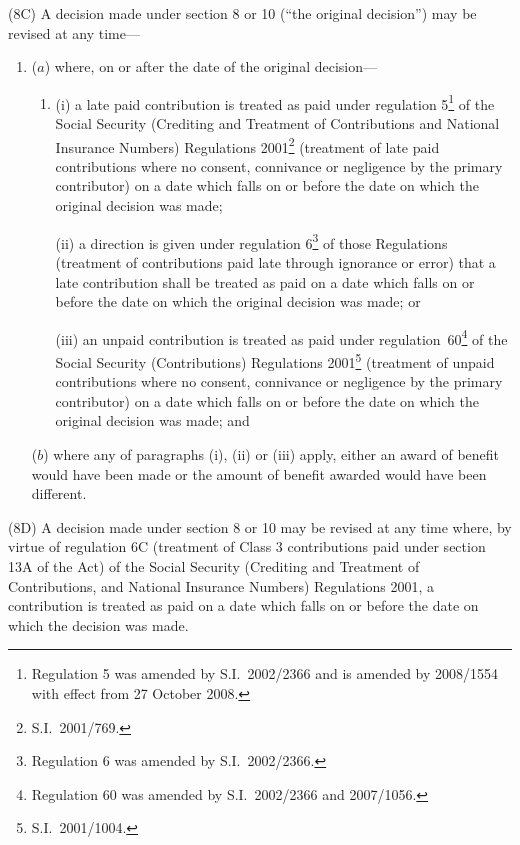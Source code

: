 \documentclass[12pt,a4paper]{article}
\begin{document}
(8C) A decision made under section 8 or 10 (“the original decision”) may be revised at any time—
\begin{enumerate}\item[]
($a$) where, on or after the date of the original decision—
\begin{enumerate}\item[]
(i) a late paid contribution is treated as paid under regulation 5\footnote{Regulation 5 was amended by S.I.~2002/2366 and is amended by 2008/1554 with effect from 27 October 2008.} of the Social Security (Crediting and Treatment of Contributions and National Insurance Numbers) Regulations 2001\footnote{S.I.~2001/769.} (treatment of late paid contributions where no consent, connivance or negligence by the primary contributor) on a date which falls on or before the date on which the original decision was made;

(ii) a direction is given under regulation 6\footnote{Regulation 6 was amended by S.I.~2002/2366.} of those Regulations (treatment of contributions paid late through ignorance or error) that a late contribution shall be treated as paid on a date which falls on or before the date on which the original decision was made; or

(iii) an unpaid contribution is treated as paid under regulation~60\footnote{Regulation 60 was amended by S.I.~2002/2366 and 2007/1056.} of the Social Security (Contributions) Regulations 2001\footnote{S.I.~2001/1004.} (treatment of unpaid contributions where no consent, connivance or negligence by the primary contributor) on a date which falls on or before the date on which the original decision was made; and
\end{enumerate}

($b$) where any of paragraphs (i), (ii) or (iii) apply, either an award of benefit would have been made or the amount of benefit awarded would have been different.
\end{enumerate}

(8D) A decision made under section 8 or 10 may be revised at any time where, by virtue of regulation 6C (treatment of Class 3 contributions paid under section 13A of the Act) of the Social Security (Crediting and Treatment of Contributions, and National Insurance Numbers) Regulations 2001, a contribution is treated as paid on a date which falls on or before the date on which the decision was made.

\end{document}
